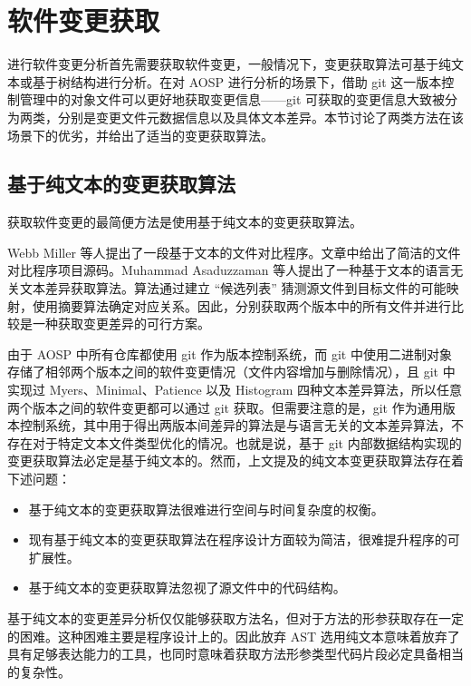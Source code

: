 \section{软件变更获取}\label{software-diff-extract}

进行软件变更分析首先需要获取软件变更，一般情况下，变更获取算法可基于纯文本或基于树结构进行分析。在对 AOSP 进行分析的场景下，借助 git 这一版本控制管理中的对象文件可以更好地获取变更信息——git 可获取的变更信息大致被分为两类，分别是变更文件元数据信息以及具体文本差异。本节讨论了两类方法在该场景下的优劣，并给出了适当的变更获取算法。

\subsection{基于纯文本的变更获取算法}

获取软件变更的最简便方法是使用基于纯文本的变更获取算法。

Webb Miller 等人提出了一段基于文本的文件对比程序\cite{SPAE-1985-AFileComparisonProgram}。文章中给出了简洁的文件对比程序项目源码。Muhammad Asaduzzaman 等人提出了一种基于文本的语言无关文本差异获取算法\cite{ICSM-2013-AsaduzzamanRSP}。算法通过建立 “候选列表” 猜测源文件到目标文件的可能映射，使用摘要算法确定对应关系。因此，分别获取两个版本中的所有文件并进行比较是一种获取变更差异的可行方案。

由于 AOSP 中所有仓库都使用 git 作为版本控制系统，而 git 中使用二进制对象存储了相邻两个版本之间的软件变更情况（文件内容增加与删除情况），且 git 中实现过 Myers、Minimal、Patience 以及 Histogram 四种文本差异算法\cite{Nugroho_2019}，所以任意两个版本之间的软件变更都可以通过 git 获取。但需要注意的是，git 作为通用版本控制系统，其中用于得出两版本间差异的算法是与语言无关的文本差异算法，不存在对于特定文本文件类型优化的情况。也就是说，基于 git 内部数据结构实现的变更获取算法必定是基于纯文本的。然而，上文提及的纯文本变更获取算法存在着下述问题：

\begin{itemize}
    \item 基于纯文本的变更获取算法很难进行空间与时间复杂度的权衡。
    \item 现有基于纯文本的变更获取算法在程序设计方面较为简洁，很难提升程序的可扩展性。
    \item 基于纯文本的变更获取算法忽视了源文件中的代码结构。
\end{itemize}

基于纯文本的变更差异分析仅仅能够获取方法名，但对于方法的形参获取存在一定的困难。这种困难主要是程序设计上的。因此放弃 AST 选用纯文本意味着放弃了具有足够表达能力的工具，也同时意味着获取方法形参类型代码片段必定具备相当的复杂性。

